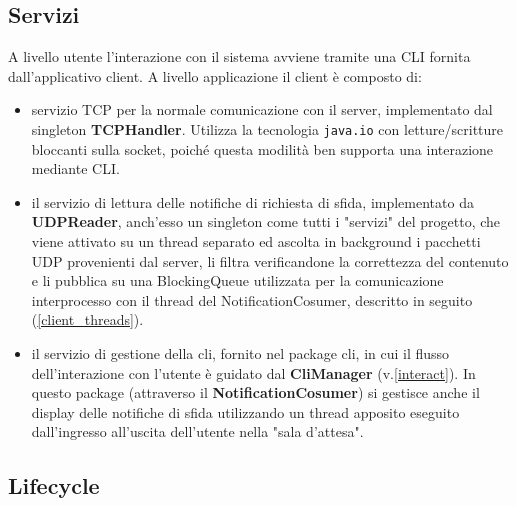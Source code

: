 \documentclass{article}
\begin{document}
    \subsection{Servizi}\label{client-services}
    A livello utente l'interazione con il sistema avviene tramite una CLI fornita dall'applicativo client. A livello applicazione il client è composto di:
    \begin{itemize}
        \item servizio TCP per la normale comunicazione con il server, implementato dal singleton \textbf{TCPHandler}. Utilizza la tecnologia \texttt{java.io} con letture/scritture bloccanti sulla socket, poiché questa modilità ben supporta una interazione mediante CLI.
        \item il servizio di lettura delle notifiche di richiesta di sfida, implementato da \textbf{UDPReader}, anch'esso un singleton come tutti i "servizi" del progetto, che viene attivato su un thread separato ed ascolta in background i pacchetti UDP provenienti dal server, li filtra verificandone la correttezza del contenuto e li pubblica su una BlockingQueue utilizzata per la comunicazione interprocesso con il thread del NotificationCosumer, descritto in seguito (\ref{client_threads}).
        \item il servizio di gestione della cli, fornito nel package cli, in cui il flusso dell'interazione con l'utente è guidato dal \textbf{CliManager} (v.\ref{interact}). In questo package (attraverso il \textbf{NotificationCosumer}) si gestisce anche il display delle notifiche di sfida utilizzando un thread apposito eseguito dall'ingresso all'uscita dell'utente nella "sala d'attesa".
    \end{itemize}

    \subsection{Lifecycle}
\end{document}
